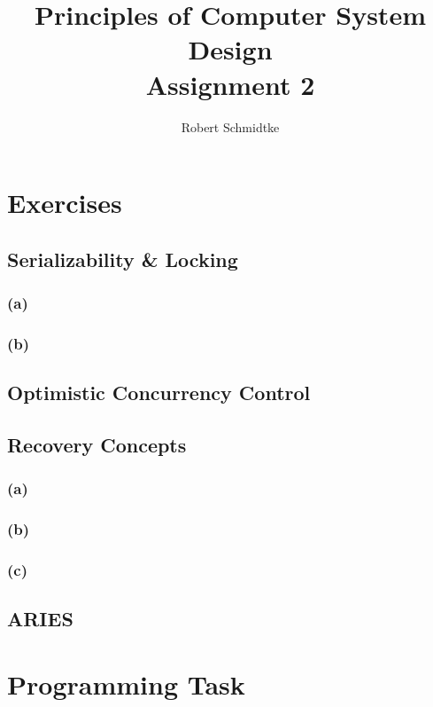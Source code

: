 \documentclass[a4paper,11pt]{article}
\title{Principles of Computer System Design\\Assignment 2}
\author{Robert Schmidtke}
\begin{document}
\maketitle

\section{Exercises}
\label{sec:ex}

\subsection{Serializability \& Locking}
\label{sec:ex1}

\subsubsection*{(a)}
\subsubsection*{(b)}

\subsection{Optimistic Concurrency Control}
\label{sec:ex2}

\subsection{Recovery Concepts}
\label{sec:ex3}

\subsubsection*{(a)}
\subsubsection*{(b)}
\subsubsection*{(c)}

\subsection{ARIES}
\label{sec:ex4}

\section{Programming Task}
\label{sec:pt}
\end{document}
